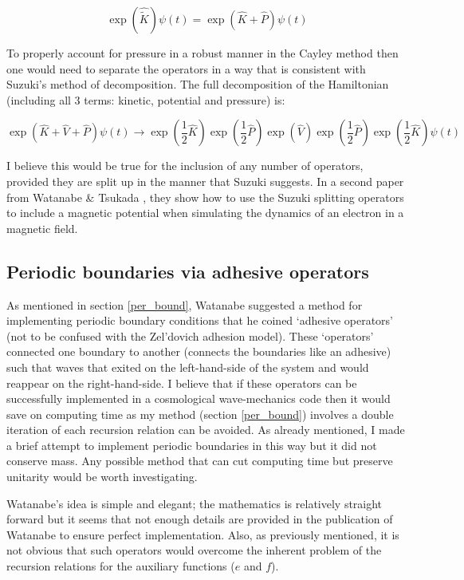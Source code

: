 \begin{equation}
\exp(\hat{\tilde{K}})\psi(t) = \exp(\hat{K} + \hat{P}) \psi(t)
\end{equation}

\noindent To properly account for pressure in a robust manner in the Cayley method then one would need to separate the operators in a way that is consistent with Suzuki's method of decomposition. The full decomposition of the Hamiltonian (including all 3 terms: kinetic, potential and pressure) is:

\begin{equation}
\exp(\hat{K}+\hat{V}+\hat{P})\psi(t)\rightarrow  \exp(\frac{1}{2}\hat{K})\exp(\frac{1}{2}\hat{P})\exp(\hat{V}) \exp(\frac{1}{2}\hat{P})\exp(\frac{1}{2}\hat{K}) \psi(t)
\end{equation}

\noindent I believe this would be true for the inclusion of any number of operators, provided they are split up in the manner that Suzuki suggests. In a second paper from Watanabe \& Tsukada \citep{bib_wat2}, they show how to use the Suzuki splitting operators to include a magnetic potential when simulating the dynamics of an electron in a magnetic field.

\subsection{Periodic boundaries via adhesive operators}
As mentioned in section \ref{per_bound}, Watanabe \citep{bib_wat} suggested a method for implementing periodic boundary conditions that he coined `adhesive operators' (not to be confused with the Zel'dovich adhesion model). These `operators' connected one boundary to another (connects the boundaries like an adhesive) such that waves that exited on the left-hand-side of the system and would reappear on the right-hand-side. I believe that if these operators can be successfully implemented in a cosmological wave-mechanics code then it would save on computing time as my method (section \ref{per_bound}) involves a double iteration of each recursion relation can be avoided. As already mentioned, I made a brief attempt to implement periodic boundaries in this way but it did not conserve mass. Any possible method that can cut computing time but preserve unitarity would be worth investigating.

Watanabe's idea is simple and elegant; the mathematics is relatively straight forward but it seems that not enough details are provided in the publication of Watanabe to ensure perfect implementation. Also, as previously mentioned, it is not obvious that such operators would overcome the inherent problem of the recursion relations for the auxiliary functions ($e$ and $f$).


